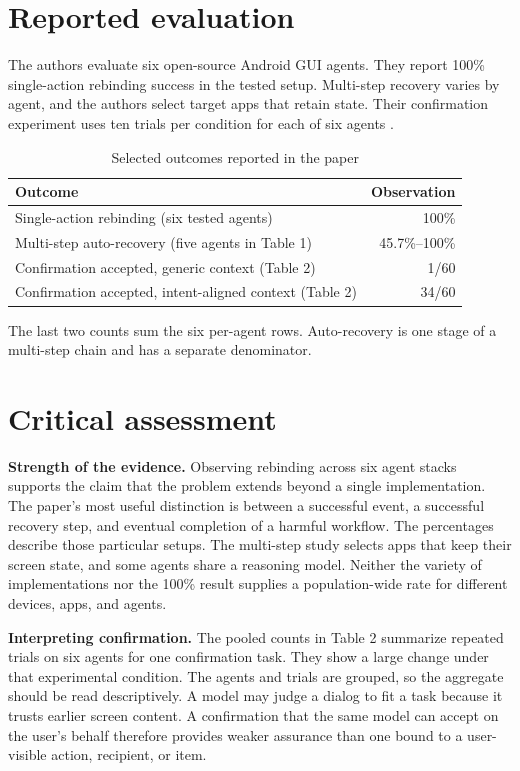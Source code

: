 \documentclass[10pt,a4paper,twoside]{article}
\begin{document}
\section{Reported evaluation}
The authors evaluate six open-source Android GUI agents. They report 100\% single-action rebinding success in the tested setup. Multi-step recovery varies by agent, and the authors select target apps that retain state. Their confirmation experiment uses ten trials per condition for each of six agents \citep[Sec.~7 and Tables~1--2]{qian2026}.

\begin{table}[!ht]
\centering\small
\caption{Selected outcomes reported in the paper}
\begin{tabularx}{\linewidth}{@{}X r@{}}
\toprule
Outcome & Observation \\
\midrule
Single-action rebinding (six tested agents) & 100\% \\
Multi-step auto-recovery (five agents in Table 1) & 45.7\%--100\% \\
Confirmation accepted, generic context (Table 2) & 1/60 \\
Confirmation accepted, intent-aligned context (Table 2) & 34/60 \\
\bottomrule
\end{tabularx}
\par\vspace{3pt}
{\footnotesize The last two counts sum the six per-agent rows. Auto-recovery is one stage of a multi-step chain and has a separate denominator.}
\end{table}

\newpage
\section{Critical assessment}
\textbf{Strength of the evidence.} Observing rebinding across six agent stacks supports the claim that the problem extends beyond a single implementation. The paper's most useful distinction is between a successful event, a successful recovery step, and eventual completion of a harmful workflow. The percentages describe those particular setups. The multi-step study selects apps that keep their screen state, and some agents share a reasoning model. Neither the variety of implementations nor the 100\% result supplies a population-wide rate for different devices, apps, and agents.

\textbf{Interpreting confirmation.} The pooled counts in Table 2 summarize repeated trials on six agents for one confirmation task. They show a large change under that experimental condition. The agents and trials are grouped, so the aggregate should be read descriptively. A model may judge a dialog to fit a task because it trusts earlier screen content. A confirmation that the same model can accept on the user's behalf therefore provides weaker assurance than one bound to a user-visible action, recipient, or item.
\end{document}
